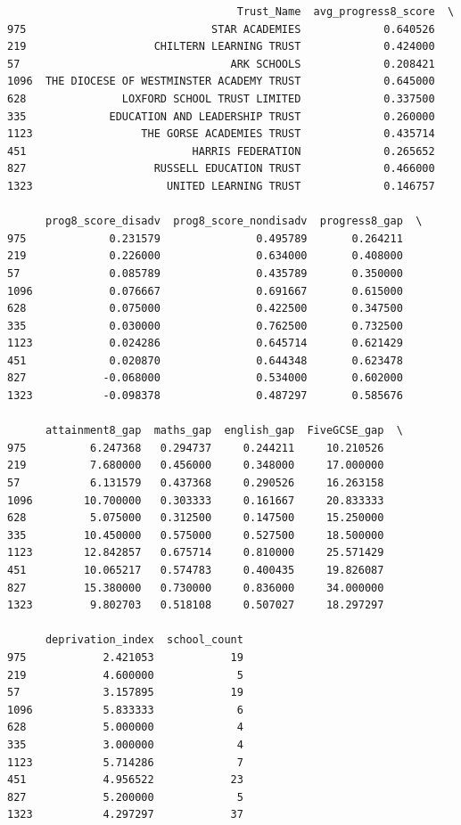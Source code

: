 \documentclass[
  letterpaper,
  DIV=11,
  numbers=noendperiod]{scrartcl}
\begin{document}
\begin{verbatim}
                                    Trust_Name  avg_progress8_score  \
975                             STAR ACADEMIES             0.640526   
219                    CHILTERN LEARNING TRUST             0.424000   
57                                 ARK SCHOOLS             0.208421   
1096  THE DIOCESE OF WESTMINSTER ACADEMY TRUST             0.645000   
628               LOXFORD SCHOOL TRUST LIMITED             0.337500   
335             EDUCATION AND LEADERSHIP TRUST             0.260000   
1123                 THE GORSE ACADEMIES TRUST             0.435714   
451                          HARRIS FEDERATION             0.265652   
827                    RUSSELL EDUCATION TRUST             0.466000   
1323                     UNITED LEARNING TRUST             0.146757   

      prog8_score_disadv  prog8_score_nondisadv  progress8_gap  \
975             0.231579               0.495789       0.264211   
219             0.226000               0.634000       0.408000   
57              0.085789               0.435789       0.350000   
1096            0.076667               0.691667       0.615000   
628             0.075000               0.422500       0.347500   
335             0.030000               0.762500       0.732500   
1123            0.024286               0.645714       0.621429   
451             0.020870               0.644348       0.623478   
827            -0.068000               0.534000       0.602000   
1323           -0.098378               0.487297       0.585676   

      attainment8_gap  maths_gap  english_gap  FiveGCSE_gap  \
975          6.247368   0.294737     0.244211     10.210526   
219          7.680000   0.456000     0.348000     17.000000   
57           6.131579   0.437368     0.290526     16.263158   
1096        10.700000   0.303333     0.161667     20.833333   
628          5.075000   0.312500     0.147500     15.250000   
335         10.450000   0.575000     0.527500     18.500000   
1123        12.842857   0.675714     0.810000     25.571429   
451         10.065217   0.574783     0.400435     19.826087   
827         15.380000   0.730000     0.836000     34.000000   
1323         9.802703   0.518108     0.507027     18.297297   

      deprivation_index  school_count  
975            2.421053            19  
219            4.600000             5  
57             3.157895            19  
1096           5.833333             6  
628            5.000000             4  
335            3.000000             4  
1123           5.714286             7  
451            4.956522            23  
827            5.200000             5  
1323           4.297297            37  
\end{verbatim}
\end{document}
